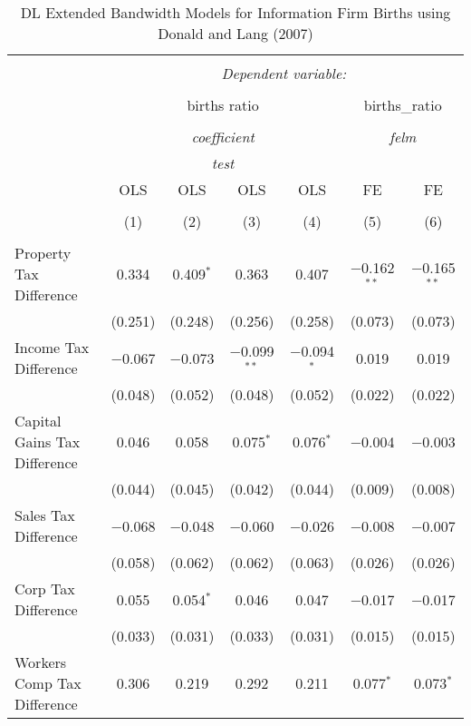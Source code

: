 
\begin{table}[!htbp] \centering 
  \caption{DL Extended Bandwidth Models for  Information Firm Births using Donald and Lang (2007)} 
  \label{} 
\begin{tabular}{@{\extracolsep{5pt}}lcccccc} 
\\[-1.8ex]\hline 
\hline \\[-1.8ex] 
 & \multicolumn{6}{c}{\textit{Dependent variable:}} \\ 
\cline{2-7} 
\\[-1.8ex] & \multicolumn{4}{c}{births ratio} & \multicolumn{2}{c}{births\_ratio} \\ 
\\[-1.8ex] & \multicolumn{4}{c}{\textit{coefficient}} & \multicolumn{2}{c}{\textit{felm}} \\ 
 & \multicolumn{4}{c}{\textit{test}} & \multicolumn{2}{c}{\textit{}} \\ 
 & OLS & OLS & OLS & OLS & FE & FE \\ 
\\[-1.8ex] & (1) & (2) & (3) & (4) & (5) & (6)\\ 
\hline \\[-1.8ex] 
 Property Tax Difference & 0.334 & 0.409$^{*}$ & 0.363 & 0.407 & $-$0.162$^{**}$ & $-$0.165$^{**}$ \\ 
  & (0.251) & (0.248) & (0.256) & (0.258) & (0.073) & (0.073) \\ 
  Income Tax Difference & $-$0.067 & $-$0.073 & $-$0.099$^{**}$ & $-$0.094$^{*}$ & 0.019 & 0.019 \\ 
  & (0.048) & (0.052) & (0.048) & (0.052) & (0.022) & (0.022) \\ 
  Capital Gains Tax Difference & 0.046 & 0.058 & 0.075$^{*}$ & 0.076$^{*}$ & $-$0.004 & $-$0.003 \\ 
  & (0.044) & (0.045) & (0.042) & (0.044) & (0.009) & (0.008) \\ 
  Sales Tax Difference & $-$0.068 & $-$0.048 & $-$0.060 & $-$0.026 & $-$0.008 & $-$0.007 \\ 
  & (0.058) & (0.062) & (0.062) & (0.063) & (0.026) & (0.026) \\ 
  Corp Tax Difference & 0.055 & 0.054$^{*}$ & 0.046 & 0.047 & $-$0.017 & $-$0.017 \\ 
  & (0.033) & (0.031) & (0.033) & (0.031) & (0.015) & (0.015) \\ 
  Workers Comp Tax Difference & 0.306 & 0.219 & 0.292 & 0.211 & 0.077$^{*}$ & 0.073$^{*}$ \\ 

\end{tabular}
\end{table}
